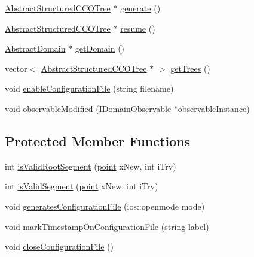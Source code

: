 \begin{DoxyCompactItemize}
\item 
\hyperlink{class_abstract_structured_c_c_o_tree}{Abstract\+Structured\+C\+C\+O\+Tree} $\ast$ \hyperlink{class_fixed_perfusion_radius_tree_generator_abfe5fdcf60f2a7b2b900ae493a882ea4}{generate} ()
\item 
\hyperlink{class_abstract_structured_c_c_o_tree}{Abstract\+Structured\+C\+C\+O\+Tree} $\ast$ \hyperlink{class_fixed_perfusion_radius_tree_generator_a9feeb40ddba160de4499f435b129dc83}{resume} ()
\item 
\hyperlink{class_abstract_domain}{Abstract\+Domain} $\ast$ \hyperlink{class_fixed_perfusion_radius_tree_generator_ab5f60bf11b980a83faccdd3a667c6bf0}{get\+Domain} ()
\item 
vector$<$ \hyperlink{class_abstract_structured_c_c_o_tree}{Abstract\+Structured\+C\+C\+O\+Tree} $\ast$ $>$ \hyperlink{class_fixed_perfusion_radius_tree_generator_a5964f771575677452fbae6c21a7470e6}{get\+Trees} ()
\item 
void \hyperlink{class_fixed_perfusion_radius_tree_generator_a6aee969aaac8fc014accbb360d4fd306}{enable\+Configuration\+File} (string filename)
\item 
void \hyperlink{class_fixed_perfusion_radius_tree_generator_add5bd06f4fe8a15529084f6d78e71b44}{observable\+Modified} (\hyperlink{class_i_domain_observable}{I\+Domain\+Observable} $\ast$observable\+Instance)
\end{DoxyCompactItemize}
\subsection*{Protected Member Functions}
\begin{DoxyCompactItemize}
\item 
int \hyperlink{class_fixed_perfusion_radius_tree_generator_ae7a7f4b87282f81b141377032a537e08}{is\+Valid\+Root\+Segment} (\hyperlink{structpoint}{point} x\+New, int i\+Try)
\item 
int \hyperlink{class_fixed_perfusion_radius_tree_generator_a306a08e5b09ced0a19fcfae49c7e7399}{is\+Valid\+Segment} (\hyperlink{structpoint}{point} x\+New, int i\+Try)
\item 
void \hyperlink{class_fixed_perfusion_radius_tree_generator_a091f126a38dd910df10b81d7c8dee4b9}{generates\+Configuration\+File} (ios\+::openmode mode)
\item 
void \hyperlink{class_fixed_perfusion_radius_tree_generator_af82dbe3c22454f0b1e09be7e77ac8118}{mark\+Timestamp\+On\+Configuration\+File} (string label)
\item 
void \hyperlink{class_fixed_perfusion_radius_tree_generator_aa705213dee8c0e4679cae60d05510ffc}{close\+Configuration\+File} ()
\end{DoxyCompactItemize}
